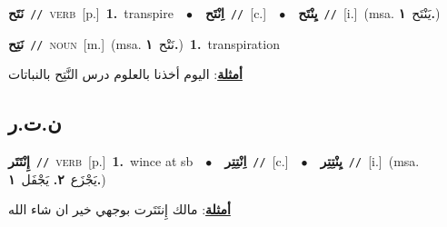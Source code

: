 \documentclass[10pt,a4paper,twoside]{article} %
\begin{document}
\begin{multicols}{2}
{\setlength\topsep{0pt}\textbf{\foreignlanguage{arabic}{نَتَح}}\ {\color{gray}\texttt{//}\color{black}}\ \textsc{verb}\ [p.]\ \textbf{1.}~transpire\ \ $\bullet$\ \ \setlength\topsep{0pt}\textbf{\foreignlanguage{arabic}{اِنْتَح}}\ {\color{gray}\texttt{//}\color{black}}\ [c.]\ \ $\bullet$\ \ \setlength\topsep{0pt}\textbf{\foreignlanguage{arabic}{يِنْتَح}}\ {\color{gray}\texttt{//}\color{black}}\ [i.]\ \color{gray}(msa. \foreignlanguage{arabic}{يَنْتَح}~\foreignlanguage{arabic}{\textbf{١.}})\color{black}\ } \vspace{2mm}

{\setlength\topsep{0pt}\textbf{\foreignlanguage{arabic}{نَتِح}}\ {\color{gray}\texttt{//}\color{black}}\ \textsc{noun}\ [m.]\ \color{gray}(msa. \foreignlanguage{arabic}{نَتْح}~\foreignlanguage{arabic}{\textbf{١.}})\color{black}\ \textbf{1.}~transpiration\  \begin{flushright}\color{gray}\foreignlanguage{arabic}{\textbf{\underline{\foreignlanguage{arabic}{أمثلة}}}: اليوم أخذنا بالعلوم درس النَّتِح بالنباتات}\end{flushright}\color{black}} \vspace{2mm}

\vspace{-3mm}
\subsection*{\color{blue}\foreignlanguage{arabic}{ن.ت.ر}\color{blue}{}} 

{\setlength\topsep{0pt}\textbf{\foreignlanguage{arabic}{إِنْتَتَر}}\ {\color{gray}\texttt{//}\color{black}}\ \textsc{verb}\ [p.]\ \textbf{1.}~wince at sb\ \ $\bullet$\ \ \setlength\topsep{0pt}\textbf{\foreignlanguage{arabic}{اِنْتِتِر}}\ {\color{gray}\texttt{//}\color{black}}\ [c.]\ \ $\bullet$\ \ \setlength\topsep{0pt}\textbf{\foreignlanguage{arabic}{يِنْتِتِر}}\ {\color{gray}\texttt{//}\color{black}}\ [i.]\ \color{gray}(msa. \foreignlanguage{arabic}{يَجْزَع}~\foreignlanguage{arabic}{\textbf{٢.}}  \foreignlanguage{arabic}{يَجْفَل}~\foreignlanguage{arabic}{\textbf{١.}})\color{black}\  \begin{flushright}\color{gray}\foreignlanguage{arabic}{\textbf{\underline{\foreignlanguage{arabic}{أمثلة}}}: مالك إِنتَتَرت بوجهي خير ان شاء الله}\end{flushright}\color{black}} \vspace{2mm}


\end{multicols}
\end{document}
